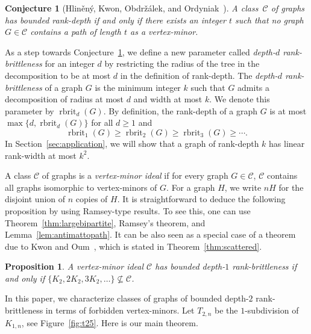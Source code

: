 \documentclass[11pt]{article}
\newtheorem{proposition}[theorem]{Proposition}
\newtheorem{conjecture}[theorem]{Conjecture}
\newcommand\rbrit{\operatorname{rbrit}}
\begin{document}
\begin{conjecture}[Hlin{\v{e}}n{\'y}, Kwon, Obdr{\v{z}}{\'a}lek, and Ordyniak~\cite{HlinenyKJS2016}]\label{conj:rankdepth}
 A class~$\mathcal{C}$ of graphs has bounded rank-depth if and only if there exists an integer $t$ such that no graph $G\in \mathcal{C}$ contains a path of length $t$ as a vertex-minor.
 \end{conjecture}
%
%

%
%
%
%
%


As a step towards Conjecture~\ref{conj:rankdepth}, we define a new parameter called \emph{depth-$d$ rank-brittleness} for an integer $d$
by restricting the radius of the tree in the decomposition to be at most $d$ in the
definition of rank-depth.
The \emph{depth-$d$ rank-brittleness} of a graph $G$ is the minimum integer $k$ such that 
$G$ admits a decomposition of radius at most $d$ and width at most $k$.
We denote this parameter by $\rbrit_d(G)$. By definition,
the rank-depth of a graph $G$ is at most $\max\{d, \rbrit_d(G)\}$ for all $d\ge 1$ and 
\[\rbrit_1(G)\ge \rbrit_2(G)\ge \rbrit_3(G)\ge \cdots .\]
In Section~\ref{sec:application}, we will show that
a graph of rank-depth $k$ has linear rank-width at most $k^2$.

  
        A class $\mathcal{C}$ of graphs is a \emph{vertex-minor ideal} if 
	for every graph $G\in \mathcal{C}$,
        $\mathcal C$ contains all graphs isomorphic to vertex-minors of $G$.
	For a graph $H$, we write $nH$ for the disjoint union of $n$ copies of $H$. 
  It is straightforward to deduce the following proposition by using Ramsey-type results. To see this, one can use Theorem~\ref{thm:largebipartite}, Ramsey's theorem, and Lemma~\ref{lem:antimattopath}. It can be also seen as a special case of a theorem due to Kwon and Oum~\cite[Theorem 1.4]{KO2018sca}, which is stated in Theorem~\ref{thm:scattered}.

        \begin{proposition}%
          A vertex-minor ideal $\mathcal C$ 
          has bounded depth-$1$ rank-brittleness if and only if
          $\{K_2,2K_2,3K_2,\ldots\}\not\subseteq \mathcal C$.
        \end{proposition}
		
	In this paper, we characterize classes of graphs of bounded depth-$2$ rank-brittleness in terms of forbidden vertex-minors.
	Let $T_{2,n}$ be the $1$-subdivision of $K_{1,n}$, see Figure~\ref{fig:t25}.
        Here is our main theorem.
\end{document}
